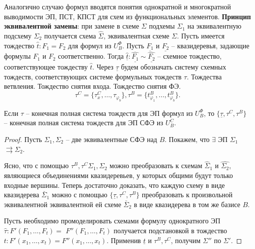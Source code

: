 \documentclass[11pt]{article}
\newcounter{th}\setcounter{th}{0}
\newcounter{stnmt}\setcounter{stnmt}{0}
\def\st{\par\smallskip\refstepcounter{stnmt}\textbf{\arabic{stnmt}}}
\newtheorem*{Statement}{Утверждение \st}
\begin{document}
Аналогично случаю формул вводятся понятия однократной и многократной выводимости ЭП, ПСТ, КПСТ
для схем из функциональных элементов.
\textbf{Принцип эквивалентной замены}: при замене в схеме \(\Sigma\) подхемы \(\Sigma_1\) на
эквивалентную подсхему \(\Sigma_2\) получается схема \(\hat{\Sigma}\), эквивалентная схеме \(\Sigma\).
Пусть имеется тождество \(\hat{t}: F_1 = F_2\) для формул из \(U^{\Phi}_B\). Пусть \(\underline{F_1}\)
и \(\underline{F_2}\) -- квазидеревья, задающие формулы \(F_1\) и \(F_2\) соответственно. Тогда
\(\hat{\underline{t}}: \hat{\underline{F_1}} \sim \hat{\underline{F_2}}\) -- схемное тождество,
соответствующее тождеству \(\hat{t}\). Через \(\underline{\tau}\) будем обозначать систему схемных
тождеств, соответствующих системе формульных тождеств \(\tau\). Тождества ветвления. Тождество
снятия входа. Тождество снятия ФЭ.
\begin{equation}
\tau^C = \{\tau_x^C, \ldots, \tau_{\varphi_b}\}, \tau^B = \{t_{\varphi_1}^B, \ldots, t_{\varphi_b}^B\}.
\end{equation}
\begin{Statement}
Если $\tau$ -- конечная полная система тождеств для ЭП формул из $U^{\Phi}_B$, то
$\{\underline{\tau}, \tau^C, \tau^B\}$ -- конечная полная система тождеств для ЭП СФЭ из $U^C_B$.
\end{Statement}
\begin{proof}
Пусть $\Sigma_1, \Sigma_2$ -- две эквивалентные СФЭ над $B$. Покажем, что $\exists$ ЭП $\Sigma_1$
$\rightrightarrows \Sigma_2$.

Ясно, что с помощью $\tau^B, \tau^C \Sigma_1, \Sigma_2$ можно преобразовать к схемам $\hat{\Sigma}_1$
и $\hat{\Sigma_2}$, являющиеся объединениями квазидеревьев, у которых общими будут только входные
вершины. Теперь достаточно доказать, что каждую схему в виде квазидерева $\breve{\Sigma_1}$
можно с помощью $\{\underline{\tau}, \tau^C, \tau^B\}$ преобразовать к произвольной эквивалентной
эквивалентной ей схеме $\breve{\Sigma_2}$ в виде квазидерева в том же базисе $B$.

Пусть необходимо промоделировать схемами формулу однократного ЭП $\hat{\tau}: F'(F_1, \ldots, F_t) =$
$F''(F_1, \ldots, F_t)$ получается подстановкой в тождество $t: F'(x_1, \ldots, x_t) = F''(x_1, \ldots, x_t)$.
Применив $\underline{t}$ и $\tau^B, \tau^C$, получим $\Sigma''$ по $\Sigma'$.
\end{proof}
\end{document}
